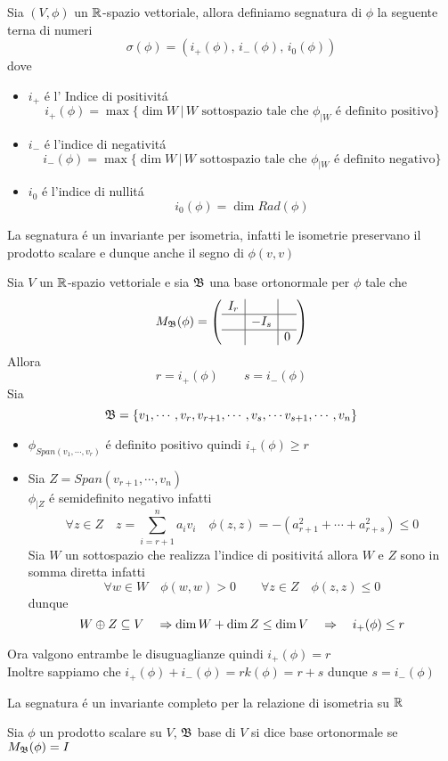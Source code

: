 \spazio
\begin{defn}[Segnatura]\bianco 
Sia $(V,\phi)$ un $\mathbb{R}$-spazio vettoriale, allora definiamo segnatura di $\phi $ la seguente terna di numeri
$$ \sigma(\phi) = \left( i_+(\phi),\,  i_- (\phi) ,\,  i_0 (\phi) \right) $$
dove
\begin{itemize}
\item $i_+ $ \'e l' Indice di positivit\'a 
$$i_+ (\phi) =\max \{ \dim W \, \vert \, W \text{ sottospazio tale che }  \phi_{\vert W } \text{ \'e definito positivo} \} $$
\item $i_-$ \'e l'indice di negativit\'a 
$$i_- (\phi) =\max \{ \dim W \, \vert \, W \text{ sottospazio tale che }  \phi_{\vert W } \text{ \'e definito negativo} \} $$
\item $i_0$ \'e l'indice di nullit\'a 
$$ i_0(\phi) = \dim Rad(\phi)$$
\end{itemize}
\end{defn}
\begin{oss}La segnatura \'e un invariante per isometria, infatti le isometrie preservano il prodotto scalare e dunque anche il segno di $\phi(v,v)$
\end{oss}
\spazio
\begin{thm}\bianco
Sia $V$ un $\mathbb{R}$-spazio vettoriale e sia $\mathfrak{B} $ una base ortonormale per $\phi$ tale che 
$$ M_{\mathfrak{B}} (\phi) = \left( \begin{array}{c|c|c }
I_r & & \\ \hline 
& -I_s & \\ \hline
& & 0 
\end{array} \right) $$
Allora 
$$ r= i_+(\phi) \qquad s=i_-(\phi) $$
\proof
Sia $$\mathfrak{B} = \{ v_1 , \cdots , v_r, v_{r+1} , \cdots , v_s, \cdots v_{s+1}, \cdots, v_n \} $$
\begin{itemize}
\item $\phi_{Span(v_1, \cdots , v_r )} $ \'e definito positivo quindi $i_+(\phi) \geq r $
\item Sia $Z= Span(v_{r+1} , \cdots , v_n )$\\
$\phi_{\vert Z} $ \'e semidefinito negativo infatti 
$$ \forall z \in Z \quad z= \sum_{i=r+1}^n a_i v_i \quad \phi(z,z) = - \left( a_{r+1}^2 + \cdots + a_{r+s}^2 \right) \leq 0 $$
Sia $W$ un sottospazio che realizza l'indice di positivit\'a allora $W$ e $Z$ sono in somma diretta infatti
$$ \forall w \in W \quad \phi(w,w)>0 \qquad \forall z \in Z \quad \phi(z,z)\leq 0$$
dunque 
$$ W \oplus Z \subseteq V \quad \Rightarrow \dim W + \dim Z \leq \dim V \quad \Rightarrow \quad i_+(\phi) \leq r$$
\end{itemize}
Ora valgono entrambe le disuguaglianze quindi $i_+(\phi)=r$\\
Inoltre sappiamo che $i_+ (\phi) + i_- (\phi) = rk(\phi) = r+s $ dunque $s= i_- (\phi)$\\
\endproof
\end{thm}
\spazio
\begin{cor}La segnatura \'e un invariante completo per la relazione di isometria su $\mathbb{R}$
\end{cor}
\spazio
\spazio
\begin{defn}\bianco Sia $\phi$ un prodotto scalare su $V$, 
$\mathfrak{B}$ base di $V$ si dice base ortonormale se $M_{\mathfrak{B}}(\phi)=I$
\end{defn}
\newpage

